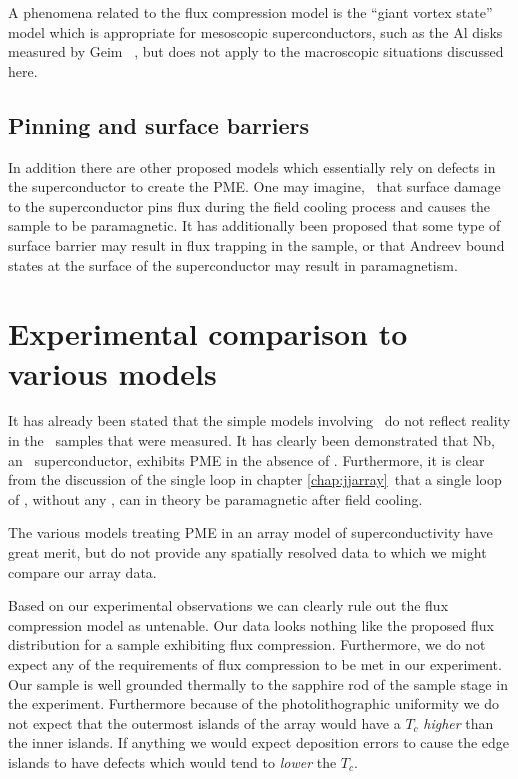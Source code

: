 A phenomena related to the flux compression model is the ``giant
vortex state'' model\cite{moshchalkov_prb_55_11793_1999,%
deo_prl_79_4653_1997} which is appropriate for mesoscopic
superconductors, such as the Al disks measured by Geim \etal\
\cite{geim_nature_396_144_1998}, but does not apply to the 
macroscopic situations discussed here. 

\subsection{Pinning and surface barriers}

In addition there are other proposed models which essentially rely
on defects in the superconductor to create the PME. 
One may imagine, \eg\, that surface damage to the superconductor
pins flux during the field cooling process 
and causes the sample to be paramagnetic. It has
additionally been proposed that some type of surface barrier
may result in flux trapping in the sample\cite{deo_prb_59_6039_1999},
or that 
Andreev bound states at the
surface of the superconductor\cite{prusseit_physc_317_396_1999}
may result in paramagnetism. 

\section{Experimental comparison to various models}

It has already been stated that the simple models involving \pijunctions\
do not reflect reality in the \jja\ samples that were measured. 
It has clearly been demonstrated that Nb, an \swave\ superconductor,
exhibits PME in the absence of \pijunctions. Furthermore, it is
clear from the discussion of the single loop in chapter \ref{chap:jjarray}\
that a single loop of \jjsnoun, without any \pijunctions, can in
theory be paramagnetic after field cooling. 

The various models treating PME in an array model of superconductivity
have great merit, but do not provide any spatially resolved data
to which we might compare our array data.

Based on our experimental observations we can clearly rule out
the flux compression model as untenable. Our data looks nothing
like the proposed flux distribution for a sample exhibiting
flux compression. Furthermore, we do not expect any of the 
requirements of flux compression to be met in our experiment. 
Our sample is well grounded thermally to the sapphire rod of the
sample stage in the experiment. Furthermore because of the
photolithographic uniformity
we do not expect that the outermost islands of the 
array would have a $T_c$ \emph{higher} than the inner islands. 
If anything we would expect deposition errors to cause the edge 
islands to have defects
which would tend to 
\emph{lower} the $T_c$. 

